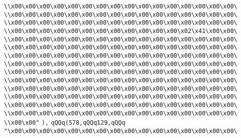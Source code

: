 \verb|\\x00\x00\x00\x00\x00\x00\x00\x00\x00\x00\x00\x00\x00\x00\x00\x00\|\newline
\verb|\\x00\x00\x00\x00\x00\x00\x00\x00\x00\x00\x00\x00\x00\x00\x00\x00\|\newline
\verb|\\x00\x00\x00\x00\x00\x00\x00\x00\x00\x00\x00\x00\x00\x00\x00\x00\|\newline
\verb|\\x00\x00\x00\x00\x00\x00\x00\x00\x00\x00\x00\x00\x02\x41\x00\x00\|\newline
\verb|\\x00\x00\x00\x00\x00\x00\x00\x00\x00\x00\x00\x00\x00\x00\x00\x00\|\newline
\verb|\\x00\x00\x00\x00\x00\x00\x00\x00\x00\x00\x00\x00\x00\x00\x00\x00\|\newline
\verb|\\x00\x00\x00\x00\x00\x00\x00\x00\x00\x00\x00\x00\x00\x00\x00\x00\|\newline
\verb|\\x00\x00\x00\x00\x00\x00\x00\x00\x00\x00\x00\x00\x00\x00\x00\x00\|\newline
\verb|\\x00\x00\x00\x00\x00\x00\x00\x00\x00\x00\x00\x00\x00\x00\x00\x00\|\newline
\verb|\\x00\x00\x00\x00\x00\x00\x00\x00\x00\x00\x00\x00\x00\x00\x00\x00\|\newline
\verb|\\x00\x00\x00\x00\x00\x00\x00\x00\x00\x00\x00\x00\x00\x00\x00\x00\|\newline
\verb|\\x00\x00\x00\x00\x00\x00\x00\x00\x00\x00\x00\x00\x00\x00\x00\x00\|\newline
\verb|\\x00\x00\x00\x00\x00\x00\x00\x00\x00\x00\x00\x00\x00\x00\x00\x00\|\newline
\verb|\\x00\x00\x00\x00\x00\x00\x00\x00\x00\x00\x00\x00\x00\x00\x00\x00\|\newline
\verb|\\x00\x00"|\newline
\verb|),|\newline
\verb|qQQq(578,qQQq129,qQQq|\newline
\verb|"\x00\x00\x00\x00\x00\x00\x00\x00\x00\x00\x00\x00\x00\x00\x00\x00\|\newline
